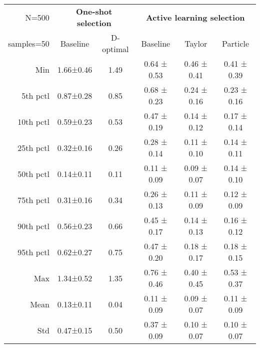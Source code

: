 \begin{tabular}{r|cc|ccc}
\toprule
 N=500& \multicolumn{2}{c|}{\textbf{One-shot selection}} & \multicolumn{3}{c}{\textbf{Active learning selection}} \\
 samples=50& Baseline & D-optimal & Baseline & Taylor & Particle \\
 \midrule
 Min        & 1.66±0.46   &  1.49     & 0.64 ± 0.53  &    0.46 ± 0.41  &   0.41 ± 0.39 \\
 5th pctl   & 0.87±0.28   &  0.85     & 0.68 ± 0.23  &    0.24 ± 0.16  &   0.23 ± 0.16 \\
 10th pctl  & 0.59±0.23   &  0.53     & 0.47 ± 0.19  &    0.14 ± 0.12  &   0.17 ± 0.14 \\
 25th pctl  & 0.32±0.16   &  0.26     & 0.28 ± 0.14  &    0.11 ± 0.10  &   0.14 ± 0.11 \\
 50th pctl  & 0.14±0.11   &  0.11     & 0.11 ± 0.09  &    0.09 ± 0.07  &   0.14 ± 0.10 \\
 75th pctl  & 0.31±0.16   &  0.34     & 0.26 ± 0.13  &    0.11 ± 0.09  &   0.12 ± 0.09 \\
 90th pctl  & 0.56±0.23   &  0.66     & 0.45 ± 0.17  &    0.14 ± 0.13  &   0.16 ± 0.12 \\
 95th pctl  & 0.62±0.27   &  0.75     & 0.47 ± 0.20  &    0.18 ± 0.17  &   0.18 ± 0.15 \\
 Max        & 1.34±0.52   &  1.35     & 0.76 ± 0.46  &    0.40 ± 0.45  &   0.53 ± 0.37 \\
 Mean       & 0.13±0.11   &  0.04     & 0.11 ± 0.09  &    0.09 ± 0.07  &   0.11 ± 0.09 \\
 Std        & 0.47±0.15   &  0.50     & 0.37 ± 0.09  &    0.10 ± 0.07  &   0.10 ± 0.07 \\
\bottomrule
\end{tabular}